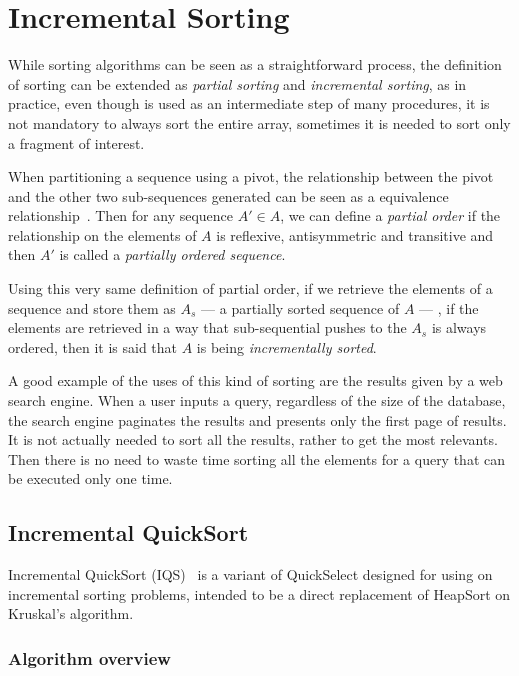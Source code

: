 
\section{Incremental Sorting}
\label{SEC:INCREMENTAL_SORTING}

While sorting algorithms can be seen as a straightforward process, the definition of sorting can be extended as \textit{partial sorting} and \textit{incremental sorting}, as in practice, even though is used as an intermediate step of many procedures, it is not mandatory to always sort the entire array, sometimes it is needed to sort only a fragment of interest.

When partitioning a sequence using a pivot, the relationship between the pivot and the other two sub-sequences generated can be seen as a equivalence relationship~\cite{10.5555/1614191}. Then for any sequence $A' \in A$, we can define a \textit{partial order} if the relationship on the elements of $A$ is reflexive, antisymmetric and transitive and then $A'$ is called a \textit{partially ordered sequence}.

Using this very same definition of partial order, if we retrieve the elements of a sequence and store them as $A_s$ --- a partially sorted sequence of $A$ --- , if the elements are retrieved in a way that sub-sequential pushes to the $A_s$ is always ordered, then it is said that $A$ is being \textit{incrementally sorted}.

A good example of the uses of this kind of sorting are the results given by a web search engine. When a user inputs a query, regardless of the size of the database, the search engine paginates the results and presents only the first page of results. It is not actually needed to sort all the results, rather to get the most relevants. Then there is no need to waste time sorting all the elements for a query that can be executed only one time.

\subsection{Incremental QuickSort}
Incremental QuickSort (IQS)~\cite{Navarro_Paredes_2010} is a variant of QuickSelect designed for using on incremental sorting problems, intended to be a direct replacement of HeapSort on Kruskal's algorithm.

\subsubsection{Algorithm overview}

